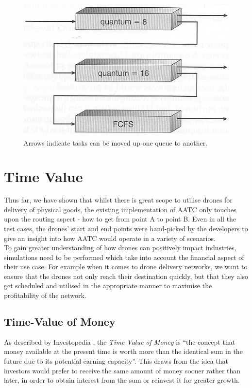 \documentclass[a4paper,11pt,titlepage]{report}
\begin{document}
\begin{figure}[!hbpt]
  \center
  \includegraphics[width=0.6\linewidth]{img/mlfqs.jpg}
  \caption{Arrows indicate tasks can be moved up one queue to another. \cite{Bell2018}}
  \label{fig:mlfqs}
\end{figure}

\section{Time Value}
Thus far, we have shown that whilst there is great scope to utilise drones for delivery of physical goods, the existing implementation of AATC only touches upon the routing aspect - how to get from point A to point B. Even in all the test cases, the drones' start and end points were hand-picked by the developers\cite{Balaji2017} to give an insight into how AATC would operate in a variety of scenarios.\\

To gain greater understanding of how drones can positively impact industries, simulations need to be performed which take into account the financial aspect of their use case. For example when it comes to drone delivery networks, we want to ensure that the drones not only reach their destination quickly, but that they also get scheduled and utilised in the appropriate manner to maximise the profitability of the network.

\subsection{Time-Value of Money}
As described by Investopedia \cite{Investopedia}, the \textit{Time-Value of Money} is ``the concept that money available at the present time is worth more than the identical sum in the future due to its potential earning capacity''. This draws from the idea that investors would prefer to receive the same amount of money sooner rather than later, in order to obtain interest from the sum or reinvest it for greater growth.
\end{document}

